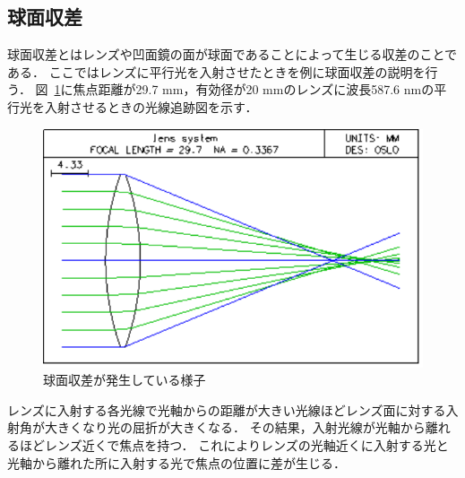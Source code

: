 \subsection{球面収差}
球面収差とはレンズや凹面鏡の面が球面であることによって生じる収差のことである．
ここではレンズに平行光を入射させたときを例に球面収差の説明を行う．
図\ \ref{fig:kyuumensyuusa_example}に焦点距離が29.7 mm，有効径が20 mmのレンズに波長587.6 nmの平行光を入射させるときの光線追跡図を示す．
\begin{figure}[htbp]
    \centering
    \includegraphics[scale=0.8]{figure/kyuumensyuusa_example.pdf}
    \caption{球面収差が発生している様子}
    \label{fig:kyuumensyuusa_example}
\end{figure}
レンズに入射する各光線で光軸からの距離が大きい光線ほどレンズ面に対する入射角が大きくなり光の屈折が大きくなる．
その結果，入射光線が光軸から離れるほどレンズ近くで焦点を持つ．
これによりレンズの光軸近くに入射する光と光軸から離れた所に入射する光で焦点の位置に差が生じる．



